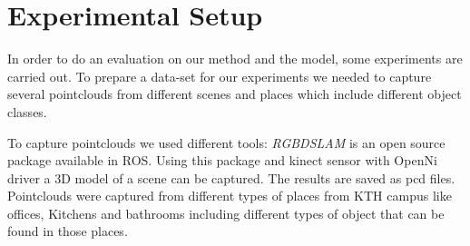 % 
% 
%  
% 
% 
% 
% 
% 


\section{Experimental Setup}
\label{ExperimentalSetup.sec}
In order to do an evaluation on our method and the model, some experiments are carried out.
To prepare a data-set for our experiments we needed to capture several pointclouds from different scenes and places which 
include different object classes.


To capture pointclouds we used different tools:
{\it RGBDSLAM} \cite{RGBDSLAM} is an open source  package available in ROS. 
Using this package and kinect sensor with OpenNi driver a 3D model of a scene can be captured. 
The results are saved as pcd files.
Pointclouds were captured from different types of places from KTH campus like offices, Kitchens and bathrooms including 
different types of object that can be found in those places.

